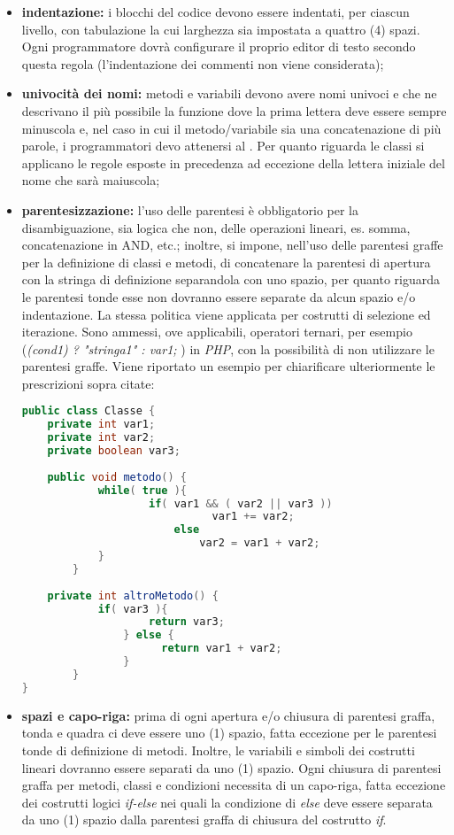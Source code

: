 					\begin{itemize}
						\item \textbf{indentazione:} i blocchi del codice devono essere indentati, per ciascun livello, con tabulazione la cui larghezza sia impostata a quattro (4) spazi. Ogni programmatore dovrà configurare il proprio editor di testo secondo questa regola (l'indentazione dei commenti non viene considerata);
						\item \textbf{univocità dei nomi:} metodi e variabili devono avere nomi univoci e che ne descrivano il più possibile la funzione dove la prima lettera deve essere sempre minuscola e, nel caso in cui il metodo/variabile sia una concatenazione di più parole, i programmatori devo attenersi al .
						Per quanto riguarda le classi si applicano le regole esposte in precedenza ad eccezione della lettera iniziale del nome che sarà maiuscola;
						\item \textbf{parentesizzazione:} l'uso delle parentesi è obbligatorio per la disambiguazione, sia logica che non, delle operazioni lineari, es. somma, concatenazione in AND, etc.; inoltre, si impone, nell'uso delle parentesi graffe per la definizione di classi e metodi, di concatenare la parentesi di apertura con la stringa di definizione separandola con uno spazio, per quanto riguarda le parentesi tonde esse non dovranno essere separate da alcun spazio e/o indentazione. La stessa politica viene applicata per costrutti di selezione ed iterazione. Sono ammessi, ove applicabili, operatori ternari, per esempio (\textit{(cond1) ? "stringa1" : var1; }) in \textit{PHP}, con la possibilità di non utilizzare le parentesi graffe. Viene riportato un esempio per chiarificare ulteriormente le prescrizioni sopra citate:
						
						\begin{lstlisting}[language=java,captionpos=b,caption={Esempio di dichiarazione di una classe in Java}]
public class Classe {
	private int var1;
	private int var2;
	private boolean var3;
	
	public void metodo() {
		    while( true ){
				    if( var1 && ( var2 || var3 ))
							  var1 += var2;
						else
						    var2 = var1 + var2;
			}
		}
	
	private int altroMetodo() {
		    if( var3 ){
				  	return var3;
				} else {
					  return var1 + var2;
				}
		}
}
						\end{lstlisting}

						\item \textbf{spazi e capo-riga:} prima di ogni apertura e/o chiusura di parentesi graffa, tonda e quadra ci deve essere uno (1) spazio, fatta eccezione per le parentesi tonde di definizione di metodi. Inoltre, le variabili e simboli dei costrutti lineari dovranno essere separati da uno (1) spazio. Ogni chiusura di parentesi graffa per metodi, classi e condizioni necessita di un capo-riga, fatta eccezione dei costrutti logici \textit{if-else} nei quali la condizione di \textit{else} deve essere separata da uno (1) spazio dalla parentesi graffa di chiusura del costrutto \textit{if}.
					\end{itemize}


